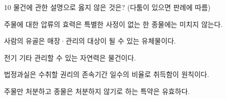\begin{question}{10}
물건에 관한 설명으로 옳지 않은 것은? (다툼이 있으면 판례에 따름)
\begin{choices}
  \item 주물에 대한 압류의 효력은 특별한 사정이 없는 한 종물에는 미치지 않는다.
  \item 사람의 유골은 매장·관리의 대상이 될 수 있는 유체물이다.
  \item 전기 기타 관리할 수 있는 자연력은 물건이다.
  \item 법정과실은 수취할 권리의 존속기간 일수의 비율로 취득함이 원칙이다.
  \item 주물만 처분하고 종물은 처분하지 않기로 하는 특약은 유효하다.
\end{choices}
\end{question}
